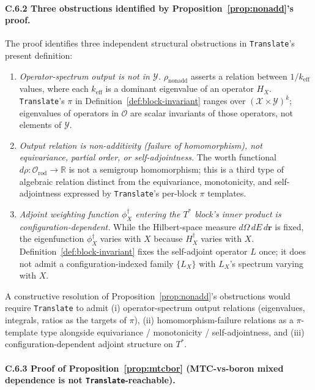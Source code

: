 \documentclass[acmsmall, screen]{acmart}
\begin{document}
\paragraph{C.6.2 Three obstructions identified by Proposition~\ref{prop:nonadd}'s proof.}
The proof identifies three independent structural obstructions in \texttt{Translate}'s present definition:
\begin{enumerate}[leftmargin=*,nosep]
  \item[(O1)] \emph{Operator-spectrum output is not in $\mathcal{Y}$.} $\rho_{\mathrm{nonadd}}$ asserts a relation between $1/k_{\mathrm{eff}}$ values, where each $k_{\mathrm{eff}}$ is a dominant eigenvalue of an operator $H_{X}$. \texttt{Translate}'s $\pi$ in Definition~\ref{def:block-invariant} ranges over $(\mathcal{X} \times \mathcal{Y})^{k}$; eigenvalues of operators in $\mathcal{O}$ are scalar invariants of those operators, not elements of $\mathcal{Y}$.
  \item[(O2)] \emph{Output relation is non-additivity (failure of homomorphism), not equivariance, partial order, or self-adjointness.} The worth functional $d\rho: \mathcal{O}_{\mathrm{rod}} \to \mathbb{R}$ is not a semigroup homomorphism; this is a third type of algebraic relation distinct from the equivariance, monotonicity, and self-adjointness expressed by \texttt{Translate}'s per-block $\pi$ templates.
  \item[(O3)] \emph{Adjoint weighting function $\phi^{\dagger}_{X}$ entering the $T^{*}$ block's inner product is configuration-dependent.} While the Hilbert-space measure $d\Omega\, dE\, d\mathbf{r}$ is fixed, the eigenfunction $\phi^{\dagger}_{X}$ varies with $X$ because $H^{\dagger}_{X}$ varies with $X$. Definition~\ref{def:block-invariant} fixes the self-adjoint operator $L$ once; it does not admit a configuration-indexed family $\{L_{X}\}$ with $L_{X}$'s spectrum varying with $X$.
\end{enumerate}

A constructive resolution of Proposition~\ref{prop:nonadd}'s obstructions would require \texttt{Translate} to admit (i) operator-spectrum output relations (eigenvalues, integrals, ratios as the targets of $\pi$), (ii) homomorphism-failure relations as a $\pi$-template type alongside equivariance / monotonicity / self-adjointness, and (iii) configuration-dependent adjoint structure on $T^{*}$.

\paragraph{C.6.3 Proof of Proposition~\ref{prop:mtcbor} (MTC-vs-boron mixed dependence is not \texttt{Translate}-reachable).}
\end{document}
